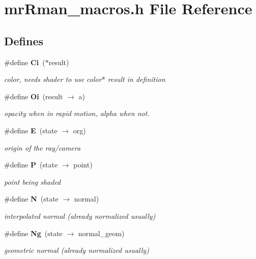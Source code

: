 \section{mr\-Rman\_\-macros.h File Reference}
\label{mrRman__macros_8h}
\subsection*{Defines}
\begin{CompactItemize}
\item 
\#define {\bf Ci}\ ($\ast$result)
\begin{CompactList}\small\item\em color, needs shader to use color$\ast$ result in definition \item\end{CompactList}\item 
\#define {\bf Oi}\ (result $\rightarrow$ a)
\begin{CompactList}\small\item\em opacity when in rapid motion, alpha when not. \item\end{CompactList}\item 
\#define {\bf E}\ (state $\rightarrow$ org)
\begin{CompactList}\small\item\em origin of the ray/camera \item\end{CompactList}\item 
\#define {\bf P}\ (state $\rightarrow$ point)
\begin{CompactList}\small\item\em point being shaded \item\end{CompactList}\item 
\#define {\bf N}\ (state $\rightarrow$ normal)
\begin{CompactList}\small\item\em interpolated normal (already normalized usually) \item\end{CompactList}\item 
\#define {\bf Ng}\ (state $\rightarrow$ normal\_\-geom)
\begin{CompactList}\small\item\em geometric normal (already normalized usually) \item\end{CompactList}\item 

\end{CompactItemize}
